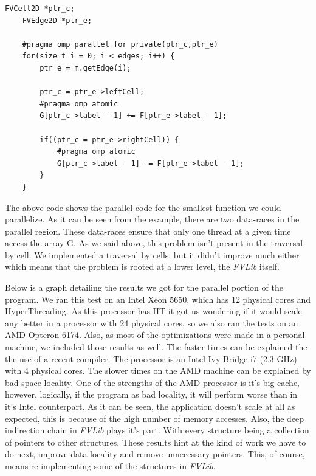 \documentclass[a4paper,10pt,openright,openbib,twocolumn]{article}
\begin{document}
\begin{minipage}{.45\textwidth}
\lstset{
    language=C++,
    basicstyle=\ttfamily\small,
    breaklines=true
}
\begin{lstlisting}[caption=Parallel part of makeFlux]    
    FVCell2D *ptr_c;     
    FVEdge2D *ptr_e;
    
    #pragma omp parallel for private(ptr_c,ptr_e)
    for(size_t i = 0; i < edges; i++) {        
        ptr_e = m.getEdge(i);
                
        ptr_c = ptr_e->leftCell;   
        #pragma omp atomic 
        G[ptr_c->label - 1] += F[ptr_e->label - 1];
        
        if((ptr_c = ptr_e->rightCell)) {
            #pragma omp atomic               
            G[ptr_c->label - 1] -= F[ptr_e->label - 1];    
        }        
    } 
\end{lstlisting}
\end{minipage} 

The above code shows the parallel code for the smallest function we could parallelize. As it can be seen from the example, there are two data-races in the parallel region. These data-races ensure that only one thread at a given time access the array G. As we said above, this problem isn't present in the traversal by cell. We implemented a traversal by cells, but it didn't improve much either which means that the problem is rooted at a lower level, the \emph{FVLib} itself. 

Below is a graph detailing the results we got for the parallel portion of the program. We ran this test on an Intel Xeon 5650, which has 12 physical cores and HyperThreading. As this processor has HT it got us wondering if it would scale any better in a processor with 24 physical cores, so we also ran the tests on an AMD Opteron 6174. Also, as most of the optimizations were made in a personal machine, we included those results as well. The faster times can be explained the the use of a recent compiler. The processor is an Intel Ivy Bridge i7 (2.3 GHz) with 4 physical cores. The slower times on the AMD machine can be explained by bad space locality. One of the strengths of the AMD processor is it's big cache, however, logically, if the program as bad locality, it will perform worse than in it's Intel counterpart. 
As it can be seen, the application doesn't scale at all as expected, this is because of the high number of memory accesses. Also, the deep indirection chain in \emph{FVLib} plays it's part. With every structure being a collection of pointers to other structures. These results hint at the kind of work we have to do next, improve data locality and remove unnecessary pointers. This, of course, means re-implementing some of the structures in \emph{FVLib}.
\end{document}
